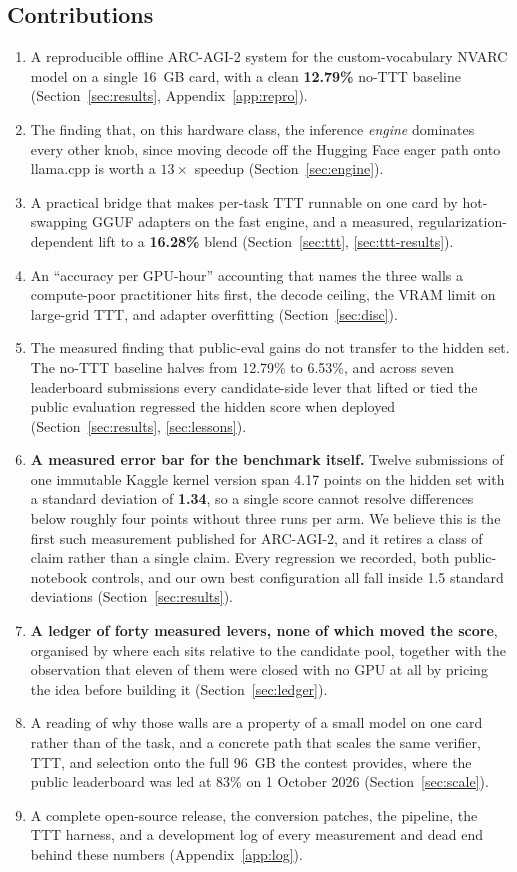 \documentclass[11pt]{article}
\begin{document}
\subsection{Contributions}
\begin{enumerate}[leftmargin=1.4em,itemsep=2pt]
\item A reproducible offline ARC-AGI-2 system for the custom-vocabulary NVARC model on a single
16~GB card, with a clean \textbf{12.79\%} no-TTT baseline (Section~\ref{sec:results},
Appendix~\ref{app:repro}).
\item The finding that, on this hardware class, the inference \emph{engine} dominates every other
knob, since moving decode off the Hugging Face eager path onto llama.cpp is worth a $13\times$ speedup
(Section~\ref{sec:engine}).
\item A practical bridge that makes per-task TTT runnable on one card by hot-swapping GGUF adapters
on the fast engine, and a measured, regularization-dependent lift to a \textbf{16.28\%} blend
(Section~\ref{sec:ttt}, \ref{sec:ttt-results}).
\item An ``accuracy per GPU-hour'' accounting that names the three walls a compute-poor practitioner
hits first, the decode ceiling, the VRAM limit on large-grid TTT, and adapter overfitting
(Section~\ref{sec:disc}).
\item The measured finding that public-eval gains do not transfer to the hidden set. The no-TTT
baseline halves from 12.79\% to 6.53\%, and across seven leaderboard submissions every candidate-side
lever that lifted or tied the public evaluation regressed the hidden score when deployed
(Section~\ref{sec:results}, \ref{sec:lessons}).
\item \textbf{A measured error bar for the benchmark itself.} Twelve submissions of one immutable
Kaggle kernel version span 4.17 points on the hidden set with a standard deviation of \textbf{1.34},
so a single score cannot resolve differences below roughly four points without three runs per arm. We
believe this is the first such measurement published for ARC-AGI-2, and it retires a class of claim
rather than a single claim. Every regression we recorded, both public-notebook controls, and our own
best configuration all fall inside 1.5 standard deviations (Section~\ref{sec:results}).
\item \textbf{A ledger of forty measured levers, none of which moved the score}, organised by
where each sits relative to the candidate pool, together with the observation that eleven of them
were closed with no GPU at all by pricing the idea before building it (Section~\ref{sec:ledger}).
\item A reading of why those walls are a property of a small model on one card rather than of the task,
and a concrete path that scales the same verifier, TTT, and selection onto the full 96~GB the contest
provides, where the public leaderboard was led at 83\% on 1 October 2026 (Section~\ref{sec:scale}).
\item A complete open-source release, the conversion patches, the pipeline, the TTT harness, and a
development log of every measurement and dead end behind these numbers (Appendix~\ref{app:log}).
\end{enumerate}
\end{document}
